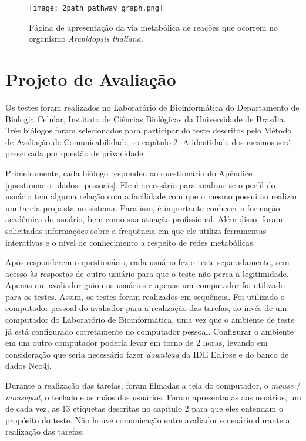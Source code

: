 \begin{figure}[!h]
    \centering
    \texttt{[image: 2path\_pathway\_graph.png]}
    \caption{Página de apresentação da via metabólica de reações que ocorrem no organismo \textit{Arabidopsis thaliana}.}
    \label{fig:2path_pathway_graph}
\end{figure}

\section{Projeto de Avaliação} \label{avaliacao}

\indent Os testes foram realizados no Laboratório de Bioinformática do Departamento de Biologia Celular, Instituto de Ciências Biológicas da Universidade de Brasília. Três biólogos foram selecionados para participar do teste descritos pelo Método de Avaliação de Comunicabilidade no capítulo 2. A identidade dos mesmos será preservada por questão de privacidade.

\indent Primeiramente, cada biólogo respondeu ao questionário do Apêndice \ref{questionario_dados_pessoais}. Ele é necessário para analisar se o perfil do usuário tem alguma relação com a facilidade com que o mesmo possui ao realizar um tarefa proposta no sistema. Para isso, é importante conhecer a formação acadêmica do usuário, bem como sua atuação profissional. Além disso, foram solicitadas informações sobre a frequência em que ele utiliza ferramentas interativas e o nível de conhecimento a respeito de redes metabólicas. 

\indent Após responderem o questionário, cada usuário fez o teste separadamente, sem acesso às respostas de outro usuário para que o teste não perca a legitimidade. Apenas um avaliador guiou os usuários e apenas um computador foi utilizado para os testes. Assim, os testes foram realizados em sequência. Foi utilizado o computador pessoal do avaliador para a realização das tarefas, ao invés de um computador do Laboratório de Bioinformática, uma vez que o ambiente de teste já está configurado corretamente no computador pessoal. Configurar o ambiente em um outro computador poderia levar em torno de 2 horas, levando em consideração que seria necessário fazer \textit{download} da IDE Eclipse e do banco de dados Neo4j.

\indent Durante a realização das tarefas, foram filmadas a tela do computador, o \textit{mouse} / \textit{mousepad}, o teclado e as mãos dos usuários. Foram apresentadas aos usuários, um de cada vez, as 13 etiquetas descritas no capítulo 2 para que eles entendam o propósito do teste. Não houve comunicação entre avaliador e usuário durante a realização das tarefas.

